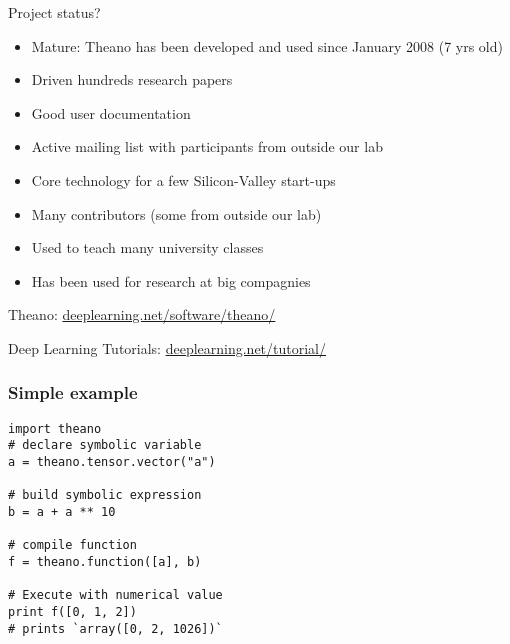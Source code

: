 \documentclass[utf8x,xcolor=pdftex,dvipsnames,table]{beamer}
\begin{document}



\begin{frame}{Project status?}
  \begin{itemize}
    \item Mature: Theano has been developed and used since January 2008 (7 yrs old)
    \item Driven hundreds research papers
    \item Good user documentation
    \item Active mailing list with participants from outside our lab
    \item Core technology for a few Silicon-Valley start-ups
    \item Many contributors (some from outside our lab)
    \item Used to teach many university classes
    \item Has been used for research at big compagnies
  \end{itemize}
  Theano: \url{deeplearning.net/software/theano/}

  Deep Learning Tutorials: \url{deeplearning.net/tutorial/}
\end{frame}

\begin{frame}[fragile]
  \frametitle{Simple example}

\begin{lstlisting}
import theano
# declare symbolic variable
a = theano.tensor.vector("a")

# build symbolic expression
b = a + a ** 10

# compile function
f = theano.function([a], b)

# Execute with numerical value
print f([0, 1, 2])
# prints `array([0, 2, 1026])`
\end{lstlisting}
\end{frame}
\end{document}

